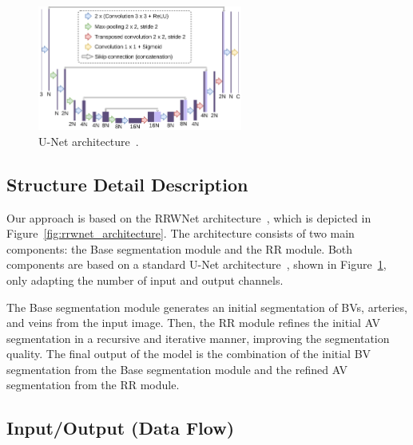 \documentclass{article}
\begin{document}
\begin{figure}[h]
    \centering
    \includegraphics[width=0.6\textwidth]{figs/unet.pdf}
    \caption{U-Net architecture~\cite{ronneberger2015unet}.}
    \label{fig:rrwnet_block}
\end{figure}


\subsection{Structure Detail Description}

Our approach is based on the RRWNet architecture~\cite{morano2024rrwnet}, which is depicted in Figure~\ref{fig:rrwnet_architecture}.
The architecture consists of two main components: the Base segmentation module and the \gls{RR} module.
Both components are based on a standard U-Net architecture~\cite{ronneberger2015unet}, shown in Figure~\ref{fig:rrwnet_block}, only adapting the number of input and output channels.

The Base segmentation module generates an initial segmentation of \glspl{BV}, arteries, and veins from the input image.
Then, the \gls{RR} module refines the initial \gls{AV} segmentation in a recursive and iterative manner, improving the segmentation quality.
The final output of the model is the combination of the initial \gls{BV} segmentation from the Base segmentation module and the refined \gls{AV} segmentation from the \gls{RR} module.

\subsection{Input/Output (Data Flow)}
\end{document}
